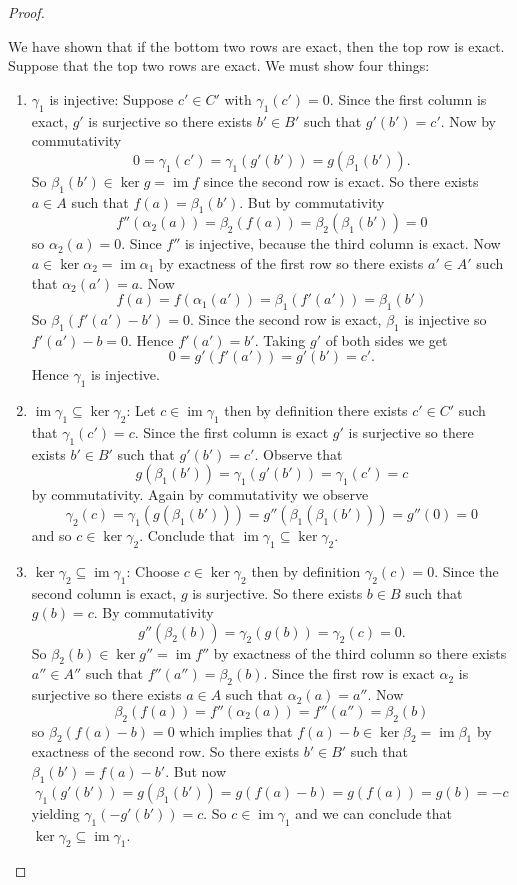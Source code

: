 \documentclass[8pt]{amsart}
\theoremstyle{plain}%
\theoremstyle{definition}
\theoremstyle{remark}
\numberwithin{equation}{section}
\newcommand{\im}{\operatorname{im}}
\begin{document}
\begin{proof}
\begin{enumerate}
		\end{enumerate}
		We have shown that if the bottom two rows are exact, then the top row is exact.\\

		Suppose that the top two rows are exact. We must show four things:
		\begin{enumerate}
			\item $\gamma_1$ is injective: Suppose $c' \in C'$  with $\gamma_1(c') = 0$. Since the first column is exact, $g'$ is surjective so there exists $b' \in B'$ such that $g'(b') = c'$. Now by commutativity $$0 = \gamma_1(c') = \gamma_1(g'(b')) = g(\beta_1(b')).$$ So $\beta_1(b') \in \ker g = \im f$ since the second row is exact. So there exists $a \in A$ such that $f(a) = \beta_1(b')$. But by commutativity $$f''(\alpha_2(a)) = \beta_2(f(a)) = \beta_2(\beta_1(b')) = 0$$ so $\alpha_2(a) = 0$. Since $f''$ is injective, because the third column is exact. Now $a \in \ker \alpha_2 = \im \alpha_1$ by exactness of the first row so there exists $a' \in A'$ such that $\alpha_2(a') = a$. Now $$f(a) = f(\alpha_1(a')) = \beta_1(f'(a')) = \beta_1(b')$$ So $\beta_1(f'(a') - b') = 0$. Since the second row is exact, $\beta_1$ is injective so $f'(a') - b = 0$. Hence $f'(a') = b'$. Taking $g'$ of both sides we get $$ 0 = g'(f'(a')) = g'(b') = c'.$$ Hence $\gamma_1$ is injective.
			\item $\im \gamma_1 \subseteq \ker \gamma_2$: Let $c \in \im \gamma_1$ then by definition there exists $c' \in C'$ such that $\gamma_1(c') = c$. Since the first column is exact $g'$ is surjective so there exists $b' \in B'$ such that $g'(b') = c'$. Observe that $$g(\beta_1(b')) = \gamma_1(g'(b')) = \gamma_1(c') = c$$ by commutativity. Again by commutativity we observe $$\gamma_2(c) = \gamma_1(g(\beta_1(b'))) = g''(\beta_1(\beta_1(b'))) = g''(0) = 0$$ and so $c \in \ker \gamma_2$. Conclude that $\im \gamma_1 \subseteq \ker \gamma_2$.
			\item $\ker \gamma_2 \subseteq \im \gamma_1$: Choose $c \in \ker \gamma_2$ then by definition $\gamma_2(c) = 0$. Since the second column is exact, $g$ is surjective. So there exists $b \in B$ such that $g(b) = c$. By commutativity $$g''(\beta_2(b)) = \gamma_2(g(b)) = \gamma_2(c) = 0.$$ So $\beta_2(b) \in \ker g'' = \im f''$ by exactness of the third column so there exists $a'' \in A''$ such that $f''(a'') = \beta_2(b)$. Since the first row is exact $\alpha_2$ is surjective so there exists $a \in A$ such that $\alpha_2(a) = a''$. Now $$\beta_2(f(a)) = f''(\alpha_2(a)) = f''(a'') = \beta_2(b)$$ so $\beta_2(f(a) - b) = 0$ which implies that $f(a) - b \in \ker \beta_2 = \im \beta_1$ by exactness of the second row. So there exists $b' \in B'$ such that $\beta_1(b') = f(a) - b'$. But now $$ \gamma_1(g'(b')) = g(\beta_1(b')) = g(f(a) - b) = g(f(a)) = g(b) = -c$$ yielding $\gamma_1(-g'(b')) = c$. So $c \in \im \gamma_1$ and we can conclude that $\ker \gamma_2 \subseteq \im \gamma_1$.

\end{enumerate}
\end{proof}
\end{document}
